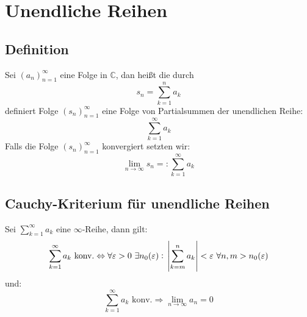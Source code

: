 \documentclass[10pt]{article}
\newcommand{\C}{\mathbb{C}}
\newcommand{\an}{{(a_n)}_{n=1}^\infty}
\newcommand{\sn}{{(s_n)}_{n=1}^\infty}
\begin{document}
    \section{Unendliche Reihen}
    \subsection{Definition}
    Sei $\an$ eine Folge in $\C$, dan  heißt die durch
    \begin{equation*}
        s_n = \sum_{k=1}^n a_k
    \end{equation*}
    definiert Folge $\sn$ eine Folge von Partialsummen der
    unendlichen Reihe:
    \begin{equation*}
        \sum_{k=1}^\infty a_k
    \end{equation*}
    Falls die Folge $\sn$ konvergiert setzten wir:
    \begin{equation*}
        \lim_{n \rightarrow \infty} s_n =: \sum_{k=1}^\infty a_k
    \end{equation*}

    \subsection{Cauchy-Kriterium für unendliche Reihen}
    Sei $\sum_{k=1}^\infty a_k$ eine $\infty$-Reihe, dann gilt:
    \begin{equation*}
        \sum_{k=1}^\infty a_k \text{ konv.} \Leftrightarrow
        \forall \varepsilon > 0\ \exists n_0(\varepsilon):\
        \abs{\sum_{k=m}^n a_k} < \varepsilon\
        \forall n, m>n_0(\varepsilon)
    \end{equation*}
    und:
    \begin{equation*}
        \sum_{k=1}^\infty a_k \text{ konv.} \Rightarrow
        \lim_{n \rightarrow \infty} a_n = 0
    \end{equation*}
\end{document}
